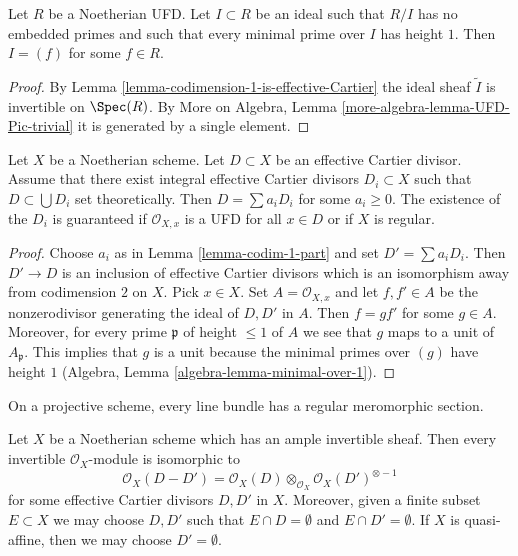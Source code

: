 \begin{lemma}
\label{lemma-UFD-one-equation-CM}
Let $R$ be a Noetherian UFD. Let $I \subset R$ be an ideal
such that $R/I$ has no embedded primes and such that
every minimal prime over $I$ has height $1$.
Then $I = (f)$ for some $f \in R$.
\end{lemma}

\begin{proof}
By Lemma \ref{lemma-codimension-1-is-effective-Cartier}
the ideal sheaf $\tilde I$ is invertible on $\Spec(R)$.
By More on Algebra, Lemma \ref{more-algebra-lemma-UFD-Pic-trivial}
it is generated by a single element.
\end{proof}

\begin{lemma}
\label{lemma-effective-Cartier-divisor-is-a-sum}
Let $X$ be a Noetherian scheme. Let $D \subset X$ be an effective
Cartier divisor. Assume that there exist integral effective Cartier
divisors $D_i \subset X$ such that $D \subset \bigcup D_i$
set theoretically. Then $D = \sum a_i D_i$ for some $a_i \geq 0$.
The existence of the $D_i$ is guaranteed if $\mathcal{O}_{X, x}$
is a UFD for all $x \in D$ or if $X$ is regular.
\end{lemma}

\begin{proof}
Choose $a_i$ as in Lemma \ref{lemma-codim-1-part} and set $D' = \sum a_i D_i$.
Then $D' \to D$ is an inclusion of effective Cartier divisors which
is an isomorphism away from codimension $2$ on $X$. Pick $x \in X$.
Set $A = \mathcal{O}_{X, x}$ and let $f, f' \in A$ be the nonzerodivisor
generating the ideal of $D, D'$ in $A$. Then $f = gf'$ for some $g \in A$.
Moreover, for every prime $\mathfrak p$ of height $\leq 1$ of $A$ we see
that $g$ maps to a unit of $A_\mathfrak p$. This implies that $g$ is
a unit because the minimal primes over $(g)$ have height $1$
(Algebra, Lemma \ref{algebra-lemma-minimal-over-1}).
\end{proof}

\begin{lemma}
\label{lemma-quasi-projective-Noetherian-pic-effective-Cartier}
\begin{slogan}
On a projective scheme, every line bundle has a regular meromorphic section.
\end{slogan}
Let $X$ be a Noetherian scheme which has an ample invertible sheaf.
Then every invertible $\mathcal{O}_X$-module is isomorphic to
$$
\mathcal{O}_X(D - D') =
\mathcal{O}_X(D) \otimes_{\mathcal{O}_X} \mathcal{O}_X(D')^{\otimes -1}
$$
for some effective Cartier divisors $D, D'$ in $X$. Moreover, given a
finite subset $E \subset X$ we may choose $D, D'$ such that
$E \cap D = \emptyset$ and $E \cap D' = \emptyset$. If
$X$ is quasi-affine, then we may choose $D' = \emptyset$.
\end{lemma}

